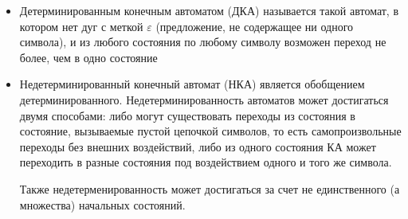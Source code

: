 \begin{itemize}
	\item Детерминированным конечным автоматом (ДКА) называется такой автомат, в котором нет дуг с меткой $\varepsilon$ (предложение, не содержащее ни одного символа), и из любого состояния по любому символу возможен переход не более, чем в одно состояние
	\item Недетерминированный конечный автомат (НКА) является обобщением детерминированного. Недетерминированность автоматов может достигаться двумя способами: либо могут существовать переходы из состояния в состояние, вызываемые пустой цепочкой символов, то есть самопроизвольные переходы без внешних воздействий, либо из одного состояния КА может переходить в разные состояния под воздействием одного и того же символа.
	
	Также недетерменированность может достигаться за счет не единственного (а множества) начальных состояний.
\end{itemize}



